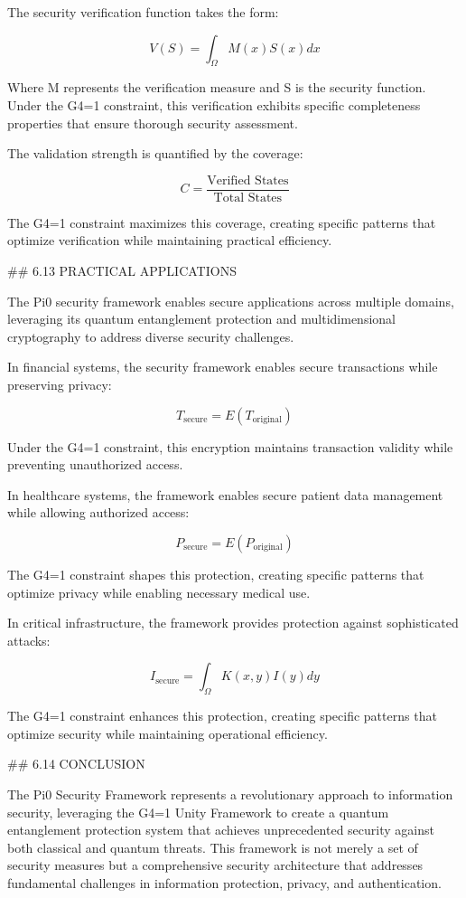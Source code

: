 The security verification function takes the form:

$$V(S) = \int_{\Omega} M(x) S(x) dx$$

Where M represents the verification measure and S is the security function. Under the G4=1 constraint, this verification exhibits specific completeness properties that ensure thorough security assessment.

The validation strength is quantified by the coverage:

$$C = \frac{\text{Verified States}}{\text{Total States}}$$

The G4=1 constraint maximizes this coverage, creating specific patterns that optimize verification while maintaining practical efficiency.

## 6.13 PRACTICAL APPLICATIONS

The Pi0 security framework enables secure applications across multiple domains, leveraging its quantum entanglement protection and multidimensional cryptography to address diverse security challenges.

In financial systems, the security framework enables secure transactions while preserving privacy:

$$T_{\text{secure}} = E(T_{\text{original}})$$

Under the G4=1 constraint, this encryption maintains transaction validity while preventing unauthorized access.

In healthcare systems, the framework enables secure patient data management while allowing authorized access:

$$P_{\text{secure}} = E(P_{\text{original}})$$

The G4=1 constraint shapes this protection, creating specific patterns that optimize privacy while enabling necessary medical use.

In critical infrastructure, the framework provides protection against sophisticated attacks:

$$I_{\text{secure}} = \int_{\Omega} K(x, y) I(y) dy$$

The G4=1 constraint enhances this protection, creating specific patterns that optimize security while maintaining operational efficiency.

## 6.14 CONCLUSION

The Pi0 Security Framework represents a revolutionary approach to information security, leveraging the G4=1 Unity Framework to create a quantum entanglement protection system that achieves unprecedented security against both classical and quantum threats. This framework is not merely a set of security measures but a comprehensive security architecture that addresses fundamental challenges in information protection, privacy, and authentication.

